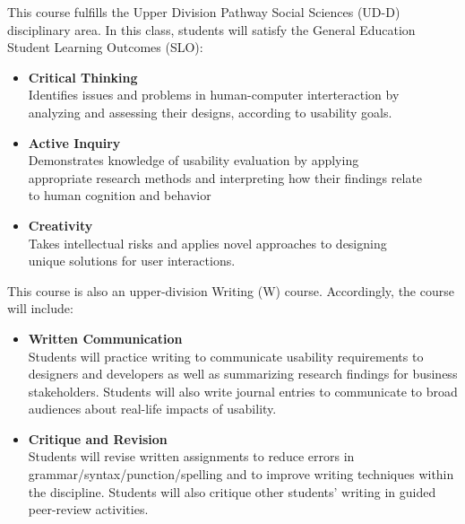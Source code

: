 \documentclass[12pt]{article}
\begin{document}
  This course fulfills the Upper Division Pathway Social Sciences (UD-D) disciplinary area. In this class, students will satisfy the General Education Student Learning Outcomes (SLO):
  \begin{itemize}
    \item \textbf{Critical Thinking}\\
     Identifies issues and problems in human-computer interteraction by\\
     analyzing and assessing their designs, according to usability goals.
    \item \textbf{Active Inquiry}\\
     Demonstrates knowledge of usability evaluation by applying\\
     appropriate research methods and interpreting how their findings relate \\
     to human cognition and behavior
    \item \textbf{Creativity}\\
     Takes intellectual risks and applies novel approaches to designing\\
     unique solutions for user interactions.
  \end{itemize}

  This course is also an upper-division Writing (W) course. Accordingly, the course will include:
  \begin{itemize}
    \item \textbf{Written Communication}\\
     Students will practice writing to communicate usability requirements
     to designers and developers as well as summarizing research findings for
     business stakeholders. Students will also write journal entries to
     communicate to broad audiences about real-life impacts of usability.
    \item \textbf{Critique and Revision}\\
     Students will revise written assignments to reduce errors in
     grammar/syntax/punction/spelling and to improve writing techniques
     within the discipline. Students will also critique other students'
     writing in guided peer-review activities. 
  \end{itemize}
\end{document}
